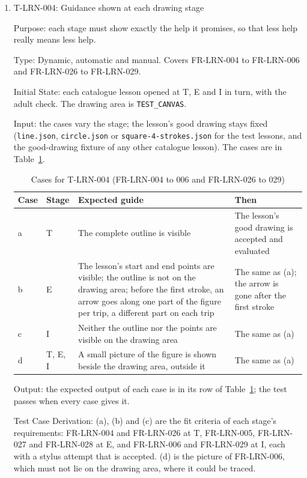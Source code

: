 \documentclass[12pt, titlepage]{article}
\newcommand{\testitem}[1]{\item #1\par\nopagebreak}
\begin{document}
\begin{enumerate}
How test will be performed: Playwright, reading the lesson record from the
test database after each case.

\testitem{T-LRN-004: Guidance shown at each drawing stage}

Purpose: each stage must show exactly the help it promises, so that less
help really means less help.

Type: Dynamic, automatic and manual. Covers FR-LRN-004 to FR-LRN-006 and
FR-LRN-026 to FR-LRN-029.

Initial State: each catalogue lesson opened at T, E and I in turn, with the
adult check. The drawing area is \texttt{TEST\_CANVAS}.

Input: the cases vary the stage; the lesson's good drawing stays fixed
(\texttt{line.json}, \texttt{circle.json} or
\texttt{square-\allowbreak{}4-\allowbreak{}strokes.json} for the test
lessons, and the good-drawing fixture of any other catalogue lesson). The
cases are in Table~\ref{tab:t-lrn-004}.

\begin{table}[htbp]
\centering\small
\caption{Cases for T-LRN-004 (FR-LRN-004 to 006 and FR-LRN-026 to 029)}
\label{tab:t-lrn-004}
\begin{tabularx}{\textwidth}{@{}l l >{\raggedright\arraybackslash}X
  >{\raggedright\arraybackslash}X@{}}
\toprule
\textbf{Case} & \textbf{Stage} & \textbf{Expected guide} &
\textbf{Then}\\
\midrule
a & T & The complete outline is visible & The lesson's good drawing is
accepted and evaluated\\
b & E & The lesson's start and end points are visible; the outline is not
on the drawing area; before the first stroke, an arrow goes along one part of
the figure per trip, a different part on each trip & The same as (a); the
arrow is gone after the first stroke\\
c & I & Neither the outline nor the points are visible on the drawing area &
The same as (a)\\
d & T, E, I & A small picture of the figure is shown beside the drawing area,
outside it & The same as (a)\\
\bottomrule
\end{tabularx}
\end{table}

Output: the expected output of each case is in its row of
Table~\ref{tab:t-lrn-004}; the test passes when every case gives it.

Test Case Derivation: (a), (b) and (c) are the fit criteria of each stage's
requirements: FR-LRN-004 and FR-LRN-026 at T, FR-LRN-005, FR-LRN-027 and
FR-LRN-028 at E, and FR-LRN-006 and FR-LRN-029 at I, each with a stylus attempt
that is accepted. (d) is the picture of FR-LRN-006, which must not lie on the
drawing area, where it could be traced.


\end{enumerate}
\end{document}
